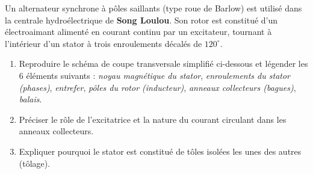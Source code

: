 \documentclass[11pt]{article}
\begin{document}
\begin{exercice}
Un alternateur synchrone à pôles saillants (type roue de Barlow) est utilisé dans la centrale hydroélectrique de \textbf{Song Loulou}. Son rotor est constitué d'un électroaimant alimenté en courant continu par un excitateur, tournant à l'intérieur d'un stator à trois enroulements décalés de $120^\circ$.

\begin{enumerate}
    \item Reproduire le schéma de coupe transversale simplifié ci-dessous et légender les 6 éléments suivants : \textit{noyau magnétique du stator}, \textit{enroulements du stator (phases)}, \textit{entrefer}, \textit{pôles du rotor (inducteur)}, \textit{anneaux collecteurs (bagues)}, \textit{balais}.
    \begin{center}
    \end{center}
    \item Préciser le rôle de l'excitatrice et la nature du courant circulant dans les anneaux collecteurs.
    \item Expliquer pourquoi le stator est constitué de tôles isolées les unes des autres (tôlage).
\end{enumerate}
\end{exercice}
\end{document}
